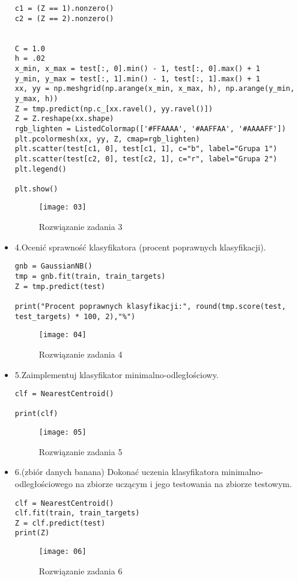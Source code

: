\documentclass[12pt,a4paper]{article}
\begin{document}
\begin{itemize}
\begin{lstlisting}
c1 = (Z == 1).nonzero()
c2 = (Z == 2).nonzero()


C = 1.0
h = .02
x_min, x_max = test[:, 0].min() - 1, test[:, 0].max() + 1
y_min, y_max = test[:, 1].min() - 1, test[:, 1].max() + 1
xx, yy = np.meshgrid(np.arange(x_min, x_max, h), np.arange(y_min, y_max, h))
Z = tmp.predict(np.c_[xx.ravel(), yy.ravel()])
Z = Z.reshape(xx.shape)
rgb_lighten = ListedColormap(['#FFAAAA', '#AAFFAA', '#AAAAFF'])
plt.pcolormesh(xx, yy, Z, cmap=rgb_lighten)
plt.scatter(test[c1, 0], test[c1, 1], c="b", label="Grupa 1")
plt.scatter(test[c2, 0], test[c2, 1], c="r", label="Grupa 2")
plt.legend()

plt.show()
	\end{lstlisting}
		\begin{figure}[h]
                        \texttt{[image: 03]}
                        \centering
			\caption{Rozwiązanie zadania 3}
			\label{fig:fig3}
                \end{figure}
                \clearpage

                \item 4.Ocenić sprawność klasyfikatora (procent poprawnych klasyfikacji).
	\begin{lstlisting}
gnb = GaussianNB()
tmp = gnb.fit(train, train_targets)
Z = tmp.predict(test)

print("Procent poprawnych klasyfikacji:", round(tmp.score(test, test_targets) * 100, 2),"%")
	\end{lstlisting}
		\begin{figure}[h]
                        \texttt{[image: 04]}
                        \centering
			\caption{Rozwiązanie zadania 4}
			\label{fig:fig4}
                \end{figure}
                \clearpage

        \item 5.Zaimplementuj klasyfikator minimalno-odległościowy.
	\begin{lstlisting}
clf = NearestCentroid()

print(clf)
	\end{lstlisting}
		\begin{figure}[h]
                        \texttt{[image: 05]}
                        \centering
			\caption{Rozwiązanie zadania 5}
			\label{fig:fig5}
                \end{figure}
                \clearpage

        \item 6.(zbiór danych banana) Dokonać uczenia klasyfikatora minimalno-odległościowego na zbiorze uczącym i jego testowania na zbiorze testowym.
	\begin{lstlisting}
clf = NearestCentroid()
clf.fit(train, train_targets)
Z = clf.predict(test)
print(Z)
	\end{lstlisting}
		\begin{figure}[h]
                        \texttt{[image: 06]}
                        \centering
			\caption{Rozwiązanie zadania 6}
			\label{fig:fig6}
                \end{figure}
                \clearpage


\end{itemize}
\end{document}

